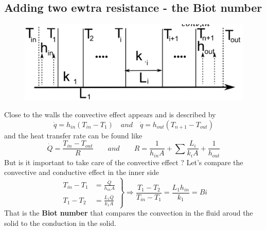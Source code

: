  			\subsection{Adding two ewtra resistance - the Biot number}
 				\begin{figure}
 				\vspace{-5mm}
 				\includegraphics[scale=0.22]{ch3/7}
 				\end{figure}
 				Close to the walls the convective effect appears and is described by 
 				\begin{equation}
 					\dot{q} = h_{in} (T_{in}-T_1) \quad and \quad \dot{q} = h_{out} (T_{n+1} - T_{out})
 				\end{equation}
 				and the heat transfer rate can be found like 
 				\begin{equation}
 					\dot{Q} = \frac{T_{in}-T_{out}}{R} \qquad and \qquad R = \frac{1}{h_{in}A} + \sum \frac{L_i}{k_iA} + \frac{1}{h_{out}}
 				\end{equation}
 				But is it important to take care of the convective effect ? Let's compare the convective and conductive effect in the inner side 
 				\begin{equation}
 					\left. 
 					\begin{aligned}
 					 	T_{in}-T_1 &= \frac{\dot{Q}}{h_{in} A} \\
 					 	T_1 - T_2 &= \frac{L_1\dot{Q}}{k_1A}
 					\end{aligned}
 					\right\} \Rightarrow \frac{T_1-T_2}{T_{in}-T_1} = \frac{L_1h_{in}}{k_1} = Bi
 				\end{equation}
 				That is the \textbf{Biot number} that compares the convection in the fluid aroud the solid to the conduction in the solid.
 			
